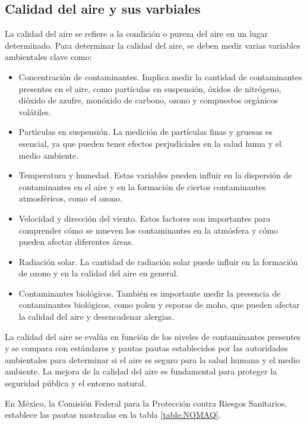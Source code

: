 \documentclass{article}%
\begin{document}
\subsection{Calidad del aire y sus varbiales}
\justify
La calidad del aire se refiere a la condición o pureza del aire en un lugar determinado. Para
determinar la calidad del aire, se deben medir varias variables ambientales clave como:
\begin{itemize}
  \item Concentración de contaminantes. Implica medir la cantidad de contaminantes presentes en el aire, 
  como partículas en suspensión, óxidos de nitrógeno, dióxido de azufre, monóxido de carbono, ozono y 
  compuestos orgánicos volátiles.
  \item Partículas en suspensión. La medición de partículas finas y gruesas es esencial, ya que pueden tener efectos 
  perjudiciales en la salud huma y el medio ambiente.
  \item Temperatura y humedad. Estas variables pueden influir en la dispersión de contaminantes en el aire 
  y en la formación de ciertos contaminantes atmosféricos, como el ozono.
  \item Velocidad y dirección del viento. Estos factores son importantes para comprender cómo se mueven 
  los contaminantes en la atmósfera y cómo pueden afectar diferentes áreas.
  \item Radiación solar. La cantidad de radiación solar puede influir en la formación de ozono y en 
  la calidad del aire en general.
  \item Contaminantes biológicos. También es importante medir la presencia de contaminantes biológicos, como polen
  y esporas de moho, que pueden afectar la calidad del aire y desencadenar alergias.
\end{itemize}
\justify
La calidad del aire se evalúa en función de los niveles de contaminantes presentes y se compara con estándares y pautas 
pautas establecidos por las autoridades ambientales para determinar si el aire es seguro para la salud humana y el medio 
ambiente. La mejora de la calidad del aire es fundamental para proteger la seguridad pública y el entorno natural.\par
\justify
En México, la Comisión Federal para la Protección contra Riesgos Sanitarios, establece las pautas mostradas en la 
tabla \ref{table:NOMAQ}.
\end{document}
